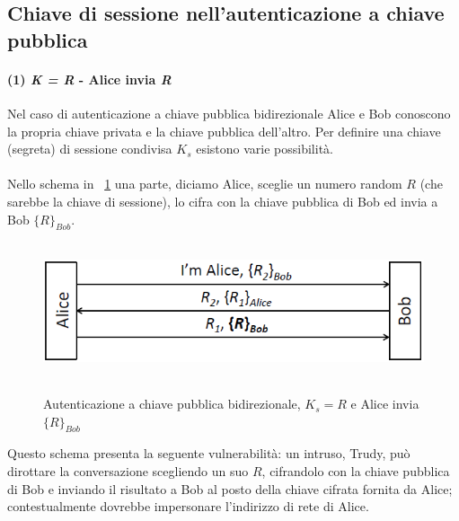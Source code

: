 \subsection{Chiave di sessione nell'autenticazione a chiave pubblica}
\paragraph{(1) \textit{K = R} - Alice invia \textit{{R}}}
\label{subsec:caso1}
Nel caso di autenticazione a chiave pubblica bidirezionale Alice e Bob conoscono la propria chiave privata e la chiave pubblica dell'altro. Per definire una chiave (segreta) di sessione condivisa $K_{s}$ esistono varie possibilità.\\ \\
Nello schema in \figurename~\ref{fig:ImgS67bis} una parte, diciamo Alice, sceglie un numero random $R$ (che sarebbe la chiave di sessione), lo cifra con la chiave pubblica di Bob ed invia a Bob $\lbrace R\rbrace_{Bob}$.
\begin{figure}[htbp]
	\centering%
	\subfigure%
	{\includegraphics[height=4cm, width=12cm, keepaspectratio]{Immagini/autenticazione/ImgS67bis.png}}
	\caption{Autenticazione a chiave pubblica bidirezionale, $K_{s} = R$ e Alice invia $\lbrace R\rbrace_{Bob}$}\label{fig:ImgS67bis} 	
\end{figure}
Questo schema presenta la seguente vulnerabilità: un intruso, Trudy, può dirottare la conversazione scegliendo un suo $R$, cifrandolo con la chiave pubblica di Bob e inviando il risultato a Bob al posto della chiave cifrata fornita da Alice; contestualmente dovrebbe impersonare l'indirizzo di rete di Alice.
